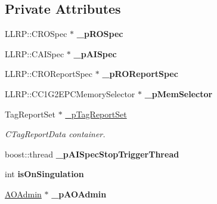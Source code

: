 \subsection*{Private Attributes}
\begin{DoxyCompactItemize}
\item 
\hypertarget{class_e_l_f_i_n_1_1_a_i_operation_a93b754086e1bc532db5b22d0c8d785f1}{L\-L\-R\-P\-::\-C\-R\-O\-Spec $\ast$ {\bfseries \-\_\-p\-R\-O\-Spec}}\label{class_e_l_f_i_n_1_1_a_i_operation_a93b754086e1bc532db5b22d0c8d785f1}

\item 
\hypertarget{class_e_l_f_i_n_1_1_a_i_operation_a08a5b54d1283d2c54686f9a4f82fea29}{L\-L\-R\-P\-::\-C\-A\-I\-Spec $\ast$ {\bfseries \-\_\-p\-A\-I\-Spec}}\label{class_e_l_f_i_n_1_1_a_i_operation_a08a5b54d1283d2c54686f9a4f82fea29}

\item 
\hypertarget{class_e_l_f_i_n_1_1_a_i_operation_a79732664a72ca6ed9fbcff3cb0c65a03}{L\-L\-R\-P\-::\-C\-R\-O\-Report\-Spec $\ast$ {\bfseries \-\_\-p\-R\-O\-Report\-Spec}}\label{class_e_l_f_i_n_1_1_a_i_operation_a79732664a72ca6ed9fbcff3cb0c65a03}

\item 
\hypertarget{class_e_l_f_i_n_1_1_a_i_operation_a2c4e4215a3a81717b30386f6d3bcd2cf}{L\-L\-R\-P\-::\-C\-C1\-G2\-E\-P\-C\-Memory\-Selector $\ast$ {\bfseries \-\_\-p\-Mem\-Selector}}\label{class_e_l_f_i_n_1_1_a_i_operation_a2c4e4215a3a81717b30386f6d3bcd2cf}

\item 
Tag\-Report\-Set $\ast$ \hyperlink{class_e_l_f_i_n_1_1_a_i_operation_a565a8b3215c53586eaaf56a91e62a4bd}{\-\_\-p\-Tag\-Report\-Set}
\begin{DoxyCompactList}\small\item\em C\-Tag\-Report\-Data container. \end{DoxyCompactList}\item 
\hypertarget{class_e_l_f_i_n_1_1_a_i_operation_a7c6ce0591568c71473935b6191603eae}{boost\-::thread {\bfseries \-\_\-p\-A\-I\-Spec\-Stop\-Trigger\-Thread}}\label{class_e_l_f_i_n_1_1_a_i_operation_a7c6ce0591568c71473935b6191603eae}

\item 
\hypertarget{class_e_l_f_i_n_1_1_a_i_operation_ae45f89acd8dd62e448a96772137a9678}{int {\bfseries is\-On\-Singulation}}\label{class_e_l_f_i_n_1_1_a_i_operation_ae45f89acd8dd62e448a96772137a9678}

\item 
\hypertarget{class_e_l_f_i_n_1_1_a_i_operation_a5a2d4fa187eafd1a1256a9c8df096a40}{\hyperlink{class_e_l_f_i_n_1_1_a_o_admin}{A\-O\-Admin} $\ast$ {\bfseries \-\_\-p\-A\-O\-Admin}}\label{class_e_l_f_i_n_1_1_a_i_operation_a5a2d4fa187eafd1a1256a9c8df096a40}

\end{DoxyCompactItemize}
